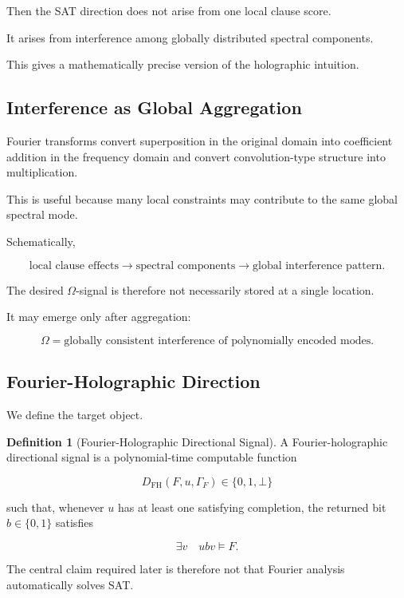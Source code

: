 \documentclass[11pt]{article}
\theoremstyle{plain}
\theoremstyle{definition}
\newtheorem{definition}[theorem]{Definition}
\begin{document}
Then the SAT direction does not arise from one local clause score.

It arises from interference among globally distributed spectral components.

This gives a mathematically precise version of the holographic intuition.

\subsection{Interference as Global Aggregation}

Fourier transforms convert superposition in the original domain into
coefficient addition in the frequency domain and convert convolution-type
structure into multiplication.

This is useful because many local constraints may contribute to the same
global spectral mode.

Schematically,

\[
    \text{local clause effects}
    \longrightarrow
    \text{spectral components}
    \longrightarrow
    \text{global interference pattern}.
\]

The desired \(\Omega\)-signal is therefore not necessarily stored at a single
location.

It may emerge only after aggregation:

\[
\boxed{
\Omega
=
\text{globally consistent interference of polynomially encoded modes}.
}
\]

\subsection{Fourier-Holographic Direction}

We define the target object.

\begin{definition}[Fourier-Holographic Directional Signal]
\label{def:fourier-holographic-direction}
A Fourier-holographic directional signal is a polynomial-time computable
function

\[
    D_{\mathrm{FH}}(F,u,\Gamma_F)
    \in
    \{0,1,\bot\}
\]

such that, whenever \(u\) has at least one satisfying completion, the returned
bit \(b\in\{0,1\}\) satisfies

\[
    \exists v
    \quad
    ubv\models F.
\]
\end{definition}

The central claim required later is therefore not that Fourier analysis
automatically solves SAT.
\end{document}

